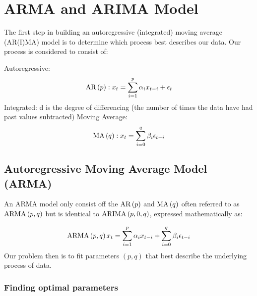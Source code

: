 \section{ARMA and ARIMA Model}

The first step in building an autoregressive (integrated) moving average (AR(I)MA) model is to determine which process best describes our data. Our process is considered to consist of:

\begin{multicols}{3}
    Autoregressive:
    \begin{equation*}
        \text{AR}\left(p\right): x_t = \sum_{i=1}^p\alpha_ix_{t-i} + \epsilon_t
    \end{equation*}
    \vfill
    \columnbreak
    \noindent Integrated: d is the degree of differencing (the number of times the data have had past values subtracted)
    \vfill
    \columnbreak
    Moving Average:
    \begin{equation*}
        \text{MA}\left(q\right): x_t = \sum_{i=0}^q\beta_i\epsilon_{t-i}
    \end{equation*}
    \vfill
    \columnbreak
\end{multicols}

\subsection{Autoregressive Moving Average Model (ARMA)}

An ARMA model only consist off the $\text{AR}\left(p\right)$ and $\text{MA}\left(q\right)$ often referred to as $\text{ARMA}\left(p,q\right)$ but is identical to \break$\text{ARIMA}\left(p,0,q\right)$, expressed mathematically as:

\begin{equation*}
   \text{ARMA}\left(p,q\right) x_t  = \sum_{i=1}^p\alpha_ix_{t-i} + \sum_{i=0}^q\beta_i\epsilon_{t-i}
\end{equation*}
Our problem then is to fit parameters $(p,q)$ that best describe the underlying process of data.

\subsubsection{Finding optimal parameters}

